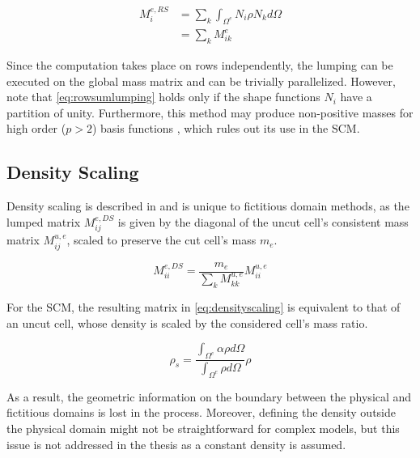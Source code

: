 \begin{equation} \label{eq:rowsumlumping}
	\begin{array}{rl}
	M_{i}^{e,RS}
	
	&= \sum_k \int_{\Omega^e} N_i \rho N_k d\Omega \\[0.5em]
	&= \sum_k M_{ik}^e
		
	\end{array}
\end{equation}

Since the computation takes place on rows independently, the lumping can be executed
on the global mass matrix and can be trivially parallelized. However, note that
\ref{eq:rowsumlumping} holds only if the shape functions $N_i$ have a partition
of unity. Furthermore, this method may produce non-positive masses for high order ($p>2$)
basis functions \cite{Duczek2014}, which rules out its use in the SCM.

%
\subsection{Density Scaling}
\label{section:?lumping}
%

Density scaling is described in \cite{Joulaian2014} and is unique to fictitious
domain methods, as the lumped matrix $M_{ij}^{e,DS}$ is given by the diagonal of the uncut cell's
consistent mass matrix $M_{ij}^{u,e}$, scaled to preserve the cut cell's mass $m_e$.

\begin{equation} \label{eq:densityscaling}
	M_{ii}^{e,DS} =
		\frac{m_e}{\sum_k M_{kk}^{u,e}} M_{ii}^{u,e}
\end{equation}

For the SCM, the resulting matrix in \ref{eq:densityscaling} is equivalent
to that of an uncut cell, whose density is scaled by the considered cell's mass ratio.

\begin{equation} \label{eq:scaleddensity}
	\rho_s = \frac{\int_{\Omega^e} \alpha \rho d\Omega}{\int_{\Omega^e} \rho d\Omega} \rho
\end{equation}

As a result, the geometric information on the boundary between the physical
and fictitious domains is lost in the process. Moreover, defining the density
outside the physical domain might not be straightforward for complex models, but
this issue is not addressed in the thesis as a constant density is assumed.


